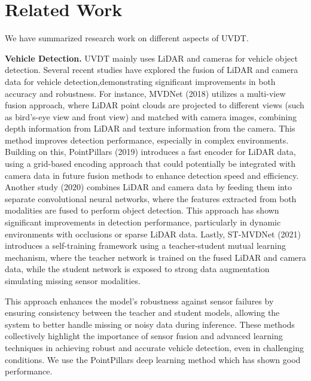 \section{Related Work}
\label{sec:formatting}

We have summarized research work on different aspects of UVDT.

\textbf{Vehicle Detection.}
UVDT mainly uses LiDAR and cameras for vehicle object detection.
Several recent studies have explored the fusion of LiDAR and camera data for vehicle detection,demonstrating significant improvements in both accuracy and robustness. 
For instance, MVDNet (2018) utilizes a multi-view fusion approach, where LiDAR point clouds are projected to different views (such as bird’s-eye view and front view) and matched with camera images, combining depth information from LiDAR and texture information from the camera. 
This method improves detection performance, especially in complex environments. 
Building on this, PointPillars (2019) introduces a fast encoder for LiDAR data, using a grid-based encoding approach that could potentially be integrated with camera data in future fusion methods to enhance detection speed and efficiency.
Another study (2020) combines LiDAR and camera data by feeding them into separate convolutional neural networks, where the features extracted from both modalities are fused to perform object detection. 
This approach has shown significant improvements in detection performance, particularly in dynamic environments with occlusions or sparse LiDAR data.
Lastly, ST-MVDNet (2021) introduces a self-training framework using a teacher-student mutual learning mechanism, where the teacher network is trained on the fused LiDAR and camera data, while the student network is exposed to strong data augmentation simulating missing sensor modalities. 

This approach enhances the model’s robustness against sensor failures by ensuring consistency between the teacher and student models, allowing the system to better handle missing or noisy data during inference.
These methods collectively highlight the importance of sensor fusion and advanced learning techniques in achieving robust and accurate vehicle detection, even in challenging conditions.
We use the PointPillars deep learning method which has shown good performance.

